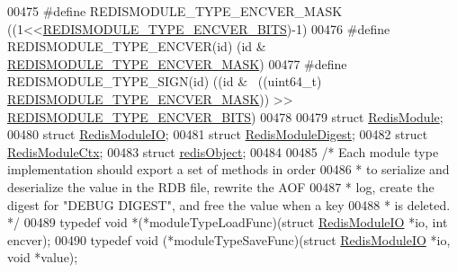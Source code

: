 \begin{DoxyCode}
{{{{{{00475 \textcolor{preprocessor}{#}\textcolor{preprocessor}{define} \textcolor{preprocessor}{REDISMODULE\_TYPE\_ENCVER\_MASK} \textcolor{preprocessor}{(}\textcolor{preprocessor}{(}1\textcolor{preprocessor}{<<}\hyperlink{server_8h_a5169ce355f1de463c1f0ad1ee4e470b6}{REDISMODULE\_TYPE\_ENCVER\_BITS}\textcolor{preprocessor}{)}\textcolor{preprocessor}{-}1\textcolor{preprocessor}{)}
00476 \textcolor{preprocessor}{#}\textcolor{preprocessor}{define} \textcolor{preprocessor}{REDISMODULE\_TYPE\_ENCVER}\textcolor{preprocessor}{(}\textcolor{preprocessor}{id}\textcolor{preprocessor}{)} \textcolor{preprocessor}{(}\textcolor{preprocessor}{id} \textcolor{preprocessor}{&} \hyperlink{server_8h_a49e0bc9132809103454a030074cde2da}{REDISMODULE\_TYPE\_ENCVER\_MASK}\textcolor{preprocessor}{)}
00477 \textcolor{preprocessor}{#}\textcolor{preprocessor}{define} \textcolor{preprocessor}{REDISMODULE\_TYPE\_SIGN}\textcolor{preprocessor}{(}\textcolor{preprocessor}{id}\textcolor{preprocessor}{)} \textcolor{preprocessor}{(}\textcolor{preprocessor}{(}\textcolor{preprocessor}{id} \textcolor{preprocessor}{&} \textcolor{preprocessor}{~}\textcolor{preprocessor}{(}\textcolor{preprocessor}{(}\textcolor{preprocessor}{uint64\_t}\textcolor{preprocessor}{)}
      \hyperlink{server_8h_a49e0bc9132809103454a030074cde2da}{REDISMODULE\_TYPE\_ENCVER\_MASK}\textcolor{preprocessor}{)}\textcolor{preprocessor}{)} \textcolor{preprocessor}{>>}
      \hyperlink{server_8h_a5169ce355f1de463c1f0ad1ee4e470b6}{REDISMODULE\_TYPE\_ENCVER\_BITS}\textcolor{preprocessor}{)}
00478 
00479 \textcolor{keyword}{struct} \hyperlink{structRedisModule}{RedisModule};
00480 \textcolor{keyword}{struct} \hyperlink{structRedisModuleIO}{RedisModuleIO};
00481 \textcolor{keyword}{struct} \hyperlink{structRedisModuleDigest}{RedisModuleDigest};
00482 \textcolor{keyword}{struct} \hyperlink{structRedisModuleCtx}{RedisModuleCtx};
00483 \textcolor{keyword}{struct} \hyperlink{structredisObject}{redisObject};
00484 
00485 \textcolor{comment}{/* Each module type implementation should export a set of methods in order}
00486 \textcolor{comment}{ * to serialize and deserialize the value in the RDB file, rewrite the AOF}
00487 \textcolor{comment}{ * log, create the digest for "DEBUG DIGEST", and free the value when a key}
00488 \textcolor{comment}{ * is deleted. */}
00489 \textcolor{keyword}{typedef} \textcolor{keywordtype}{void} *(*moduleTypeLoadFunc)(\textcolor{keyword}{struct} \hyperlink{structRedisModuleIO}{RedisModuleIO} *io, \textcolor{keywordtype}{int} encver);
00490 \textcolor{keyword}{typedef} \textcolor{keywordtype}{void} (*moduleTypeSaveFunc)(\textcolor{keyword}{struct} \hyperlink{structRedisModuleIO}{RedisModuleIO} *io, \textcolor{keywordtype}{void} *value);
}}}}}}
\end{DoxyCode}
